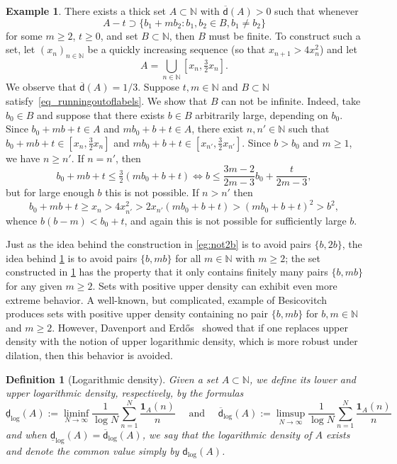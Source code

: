 \documentclass[10pt,dvipsnames]{article}
\newtheorem{definition}[theorem]{Definition}
\theoremstyle{definition}
\newtheorem{example}[theorem]{Example}
\theoremstyle{plain}
\newcommand{\N}{\mathbb{N}}
\newcommand{\dens}{\mathsf{d}}
\newcommand{\udens}{\overline{\mathsf{d}}}
\newcommand{\ldens}{\underline{\mathsf{d}}}
\newcommand{\Erdos}{Erd\H{o}s}
\newcommand{\one}{\boldsymbol{1}}
\begin{document}
\begin{example}\label{example_sparser} 
There exists a thick set $A\subset\N$ with $\udens(A)>0$ such that whenever
\begin{equation}
\label{eq_runningoutoflabels}
A-t\supset\big\{b_1+mb_2:b_1,b_2\in B, b_1\neq b_2\big\}
\end{equation}
for some $m\geq 2$, $t\geq 0$, and set $B\subset\N$, then $B$ must be finite.
To construct such a set, let $(x_n)_{n\in\N}$ be a quickly increasing sequence (so that $x_{n+1}>4x_{n}^2$) and let 
\begin{equation}
    A=\bigcup_{n\in\N}[x_n,\tfrac32x_n].
\end{equation}
We observe that $\udens(A)=1/3$.
Suppose $t,m\in\N$ and $B\subset\N$ satisfy~\eqref{eq_runningoutoflabels}. 
We show that $B$ can not be infinite.
Indeed, take $b_0\in B$ and suppose that there exists $b\in B$ arbitrarily large, depending on $b_0$.
Since $b_0+mb+t\in A$ and $mb_0+b+t\in A$, there exist $n,n'\in\N$ such that $b_0+mb+t\in[x_n,\tfrac32x_n]$ and $mb_0+b+t\in[x_{n'},\tfrac32x_{n'}]$.
Since $b>b_0$ and $m\geq1$, we have $n\geq{n'}$.
If $n={n'}$, then 
$$b_0+mb+t\leq\tfrac32(mb_0+b+t)\iff b\leq\frac{3m-2}{2m-3}b_0+\frac{t}{2m-3},$$
but for large enough $b$ this is not possible.
If $n>{n'}$ then 
$$b_0+mb+t\geq x_n>4x_{n'}^2>2x_{n'}(mb_0+b+t)>(mb_0+b+t)^2>b^2,$$
whence $b(b-m)<b_0+t$, and again this is not possible for sufficiently large $b$.
\end{example}
\medskip

Just as the idea behind the construction in \cref{eg:not2b} is to avoid pairs $\{b,2b\}$, the idea behind \cref{example_sparser} is to avoid pairs $\{b,mb\}$ for all $m \in \N$ with $m\geq2$;
the set constructed in \cref{example_sparser} has the property that it only contains finitely many pairs $\{b,mb\}$ for any given $m\geq 2$.
Sets with positive upper density can exhibit even more extreme behavior. A well-known, but complicated, example of Besicovitch~\cite{Besicovitch35} produces sets with positive upper density containing no pair $\{b,mb\}$ for $b,m\in\N$ and $m\geq 2$. However, Davenport and \Erdos{}~\cite{Davenport-Erdos36, Davenport-Erdos51} showed that if one replaces upper density with the  notion of upper logarithmic density, which is more robust under dilation, then this behavior is avoided.


\begin{definition}[Logarithmic density]
\label{def_log_density}
Given a set $A\subset\N$,  we define its lower and upper logarithmic density, respectively, by the formulas
\[
\ldens_{\log}(A):=\liminf_{N\to\infty}\frac1{\log N}\sum_{n=1}^N\frac{\one_A(n)}n\quad\text{ and }\quad\udens_{\log}(A):=\limsup_{N\to\infty}\frac1{\log N}\sum_{n=1}^N\frac{\one_A(n)}n
\]
and when $\ldens_{\log}(A)=\udens_{\log}(A)$, we say that the logarithmic density of $A$ exists and denote the common value simply by $\dens_{\log}(A)$.
\end{definition}
\end{document}
